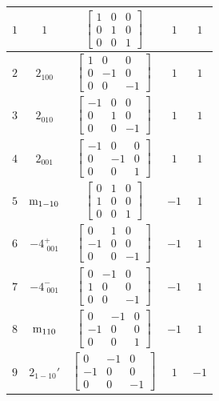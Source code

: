 \documentclass[fleqn,8pt]{jsarticle}
\begin{document}
\begin{longtable}{ccccc}
$ 1 $ & $ 1 $ & $ \begin{bmatrix} 1 & 0 & 0 \\ 0 & 1 & 0 \\ 0 & 0 & 1 \end{bmatrix} $ & $ 1 $ & $ 1 $ \\ \hline
$ 2 $ & $ 2{}_{100} $ & $ \begin{bmatrix} 1 & 0 & 0 \\ 0 & -1 & 0 \\ 0 & 0 & -1 \end{bmatrix} $ & $ 1 $ & $ 1 $ \\ \hline
$ 3 $ & $ 2{}_{010} $ & $ \begin{bmatrix} -1 & 0 & 0 \\ 0 & 1 & 0 \\ 0 & 0 & -1 \end{bmatrix} $ & $ 1 $ & $ 1 $ \\ \hline
$ 4 $ & $ 2{}_{001} $ & $ \begin{bmatrix} -1 & 0 & 0 \\ 0 & -1 & 0 \\ 0 & 0 & 1 \end{bmatrix} $ & $ 1 $ & $ 1 $ \\ \hline
$ 5 $ & $ {\rm m}_{1-10} $ & $ \begin{bmatrix} 0 & 1 & 0 \\ 1 & 0 & 0 \\ 0 & 0 & 1 \end{bmatrix} $ & $ -1 $ & $ 1 $ \\ \hline
$ 6 $ & $ -4^{+}_{\,\,001} $ & $ \begin{bmatrix} 0 & 1 & 0 \\ -1 & 0 & 0 \\ 0 & 0 & -1 \end{bmatrix} $ & $ -1 $ & $ 1 $ \\ \hline
$ 7 $ & $ -4^{-}_{\,\,001} $ & $ \begin{bmatrix} 0 & -1 & 0 \\ 1 & 0 & 0 \\ 0 & 0 & -1 \end{bmatrix} $ & $ -1 $ & $ 1 $ \\ \hline
$ 8 $ & $ {\rm m}_{110} $ & $ \begin{bmatrix} 0 & -1 & 0 \\ -1 & 0 & 0 \\ 0 & 0 & 1 \end{bmatrix} $ & $ -1 $ & $ 1 $ \\ \hline
$ 9 $ & $ 2{}_{1-10}{}' $ & $ \begin{bmatrix} 0 & -1 & 0 \\ -1 & 0 & 0 \\ 0 & 0 & -1 \end{bmatrix} $ & $ 1 $ & $ -1 $ \\ \hline

\end{longtable}
\end{document}
